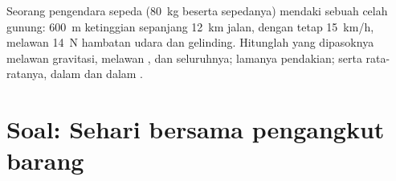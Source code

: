 \begin{exercise}[$\star\star\star$]\label{exo:g11:work-of-force:15}
Seorang pengendara sepeda (\qty{80}{kg} beserta sepedanya) mendaki
sebuah celah gunung: \qty{600}{m} ketinggian sepanjang \qty{12}{km}
jalan, dengan tetap \qty{15}{km/h}, melawan \qty{14}{N} hambatan udara
dan  gelinding. Hitunglah  yang dipasoknya melawan
gravitasi, melawan , dan seluruhnya; lamanya pendakian; serta
 rata-ratanya, dalam  dan dalam .
\end{exercise}

\section{Soal: Sehari bersama pengangkut barang}

